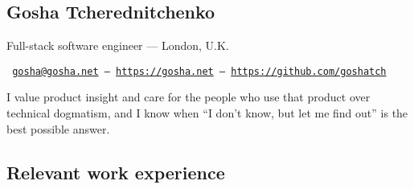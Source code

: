 \documentclass[a4paper,11pt]{article}
\begin{document}
\begin{center}
  \section*{Gosha Tcherednitchenko}
  Full-stack software engineer — London, U.K.

  \texttt{
    \href{mailto:gosha@gosha.net}{gosha@gosha.net} —
    \href{https://gosha.net}{https://gosha.net} —
    \href{https://github.com/goshatch}{https://github.com/goshatch}
  }
\end{center}

I value product insight and care for the people who use that product over
technical dogmatism, and I know when “I don’t know, but let me find out” is the
best possible answer.

\subsection*{Relevant work experience}
\end{document}
